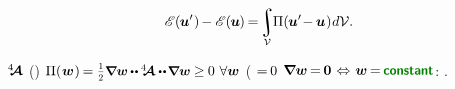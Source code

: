 \nopagebreak\vspace{-0.2em}
\begin{equation*}
\potentialenergyfunctional \hspace{.16ex} (\hspace{-0.1ex}\bm{u}'\hspace{.1ex}) \hspace{-0.2ex} -
\potentialenergyfunctional \hspace{.16ex} (\hspace{-0.1ex}\bm{u}\hspace{-0.1ex}) \hspace{-0.2ex}
= \hspace{-0.3ex}
\scalebox{0.9}{$\displaystyle\integral\displaylimits_{\mathcal{V}}$} \hspace{-0.22ex}
\potentialenergydensity (\hspace{-0.1ex}\bm{u}' \hspace{-0.4ex} - \hspace{-0.1ex} \bm{u}\hspace{.1ex})
\hspace{.1ex} d\mathcal{V}
.
\end{equation*}

 $\hspace{.08ex}{^4\hspace{-0.7ex}\bm{\mathcal{A}}}\hspace{.08ex}$
 ()
${\potentialenergydensity ( \hspace{.1ex}
\bm{w} \hspace{.1ex} ) \hspace{-0.2ex}
= \smallerdisplaystyleonehalf
\scalebox{.95}{$
   \boldnabla \bm{w}
   \hspace{-0.1ex} \dotdotp \hspace{-0.1ex}
   \stiffnesstensor \dotdotp \hspace{-0.25ex}
   \boldnabla \bm{w}
$}
\hspace{-0.1ex} \geq \hspace{-0.1ex} 0
\hspace{.8ex}
\forall \bm{w}
}$
(
${= \hspace{-0.2ex} 0}$
${
   \boldnabla \bm{w}
   \hspace{-0.2ex} = \hspace{-0.2ex}
   \bm{0}
   \hspace{.2ex}\Leftrightarrow\hspace{.2ex}
   \bm{w}
   \hspace{-0.2ex} = \hspace{-0.2ex}
   \boldconstant
}$:
.


